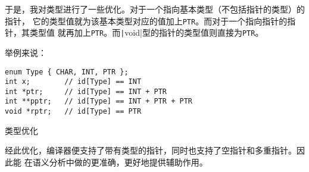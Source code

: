 于是，我对类型进行了一些优化。对于一个指向基本类型（不包括指针的类型）的指针，
它的类型值就为该基本类型对应的值加上{\tt PTR}。而对于一个指向指针的指针，其类型值
就再加上{\tt PTR}。而\texttt|void|型的指针的类型值则直接为{\tt PTR}。

举例来说：

\begin{listing}[hbt]
\begin{verbatim}
enum Type { CHAR, INT, PTR };
int x;        // id[Type] == INT
int *ptr;     // id[Type] == INT + PTR
int **pptr;   // id[Type] == INT + PTR + PTR
void *rptr;   // id[Type] == PTR
\end{verbatim}
\caption{类型优化}
\end{listing}

经此优化，编译器便支持了带有类型的指针，同时也支持了空指针和多重指针。因此能
在语义分析中做的更准确，更好地提供辅助作用。
